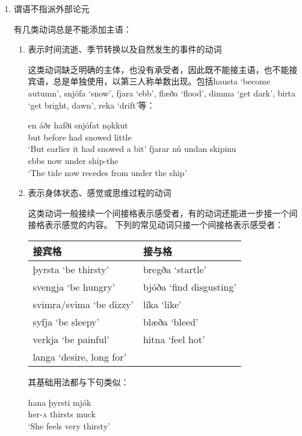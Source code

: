 \begin{enumerate}
\setlength{\parindent}{2em}
    \item 谓语不指派外部论元

    有几类动词总是不能添加主语：
    \begin{enumerate}
    \setlength{\parindent}{2em}
        \item 表示时间流逝、季节转换以及自然发生的事件的动词

        这类动词缺乏明确的主体，也没有承受者，因此既不能接主语，也不能接宾语，总是单独使用，以第三人称单数出现。包括hausta `become autumn’, snjófa `snow’, fjara `ebb’, flæða `flood’, dimma `get dark’, birta `get bright, dawn’, reka `drift’等：
        \begin{exe}
            \ex
            \gll en	áðr	hafði	snjófat	nǫkkut\\
but	before	had	snowed	little\\
\trans `But earlier it had snowed a bit’
\ex \gll
fjarar	nú	undan	skipinu\\
ebbs	now	under	ship-the\\
\trans `The tide now recedes from under the ship’
        \end{exe}

        \item 表示身体状态、感觉或思维过程的动词

        这类动词一般接续一个间接格表示感受者，有的动词还能进一步接一个间接格表示感觉的内容。
        下列的常见动词只接一个间接格表示感受者：
        \begin{table}[H]
            \centering
            \begin{tabular}{ll}
            \toprule
            接宾格&接与格\\ \midrule
þyrsta `be thirsty’&	bregða `startle’\\
svengja `be hungry’	&bjóða `find disgusting’\\
svimra/svima `be dizzy’&	líka `like’\\
syfja `be sleepy’&	blæða `bleed’\\
verkja `be painful’&	hitna `feel hot’\\
langa `desire, long for’&	\\
\bottomrule
            \end{tabular}
        \end{table}

        其基础用法都与下句类似：
        \begin{exe}
            \ex \gll 
            hana	þyrsti	mjók\\	
her-\textsc{a}	thirsts	muck	\\
\trans `She feels very thirsty’
        \end{exe}
	

\end{enumerate}
\end{enumerate}
